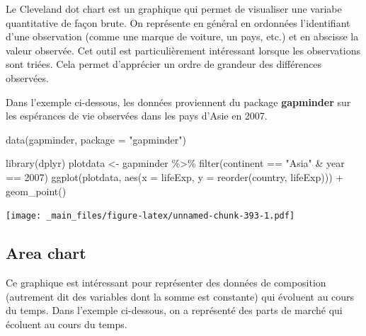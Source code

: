 \documentclass[
]{book}
\newenvironment{Shaded}{\begin{snugshade}}{\end{snugshade}}
\newcommand{\AttributeTok}[1]{\textcolor[rgb]{0.77,0.63,0.00}{#1}}
\newcommand{\DecValTok}[1]{\textcolor[rgb]{0.00,0.00,0.81}{#1}}
\newcommand{\FunctionTok}[1]{\textcolor[rgb]{0.00,0.00,0.00}{#1}}
\newcommand{\NormalTok}[1]{#1}
\newcommand{\OtherTok}[1]{\textcolor[rgb]{0.56,0.35,0.01}{#1}}
\newcommand{\SpecialCharTok}[1]{\textcolor[rgb]{0.00,0.00,0.00}{#1}}
\newcommand{\StringTok}[1]{\textcolor[rgb]{0.31,0.60,0.02}{#1}}
\theoremstyle{definition}
\theoremstyle{definition}
\theoremstyle{definition}
\theoremstyle{definition}
\theoremstyle{remark}
\begin{document}
Le Cleveland dot chart est un graphique qui permet de visualiser une variabe quantitative de façon brute. On représente en général en ordonnées l'identifiant d'une observation (comme une marque de voiture, un pays, etc.) et en abscisse la valeur observée. Cet outil est particulièrement intéressant lorsque les observations sont triées. Cela permet d'apprécier un ordre de grandeur des différences observées.

Dans l'exemple ci-dessous, les données proviennent du package \textbf{gapminder} sur les espérances de vie observées dans les pays d'Asie en 2007.

\begin{Shaded}
\begin{Highlighting}[]
\FunctionTok{data}\NormalTok{(gapminder, }\AttributeTok{package =} \StringTok{"gapminder"}\NormalTok{)}

\FunctionTok{library}\NormalTok{(dplyr)}
\NormalTok{plotdata }\OtherTok{\textless{}{-}}\NormalTok{ gapminder }\SpecialCharTok{\%\textgreater{}\%}
  \FunctionTok{filter}\NormalTok{(continent }\SpecialCharTok{==} \StringTok{"Asia"} \SpecialCharTok{\&} 
\NormalTok{         year }\SpecialCharTok{==} \DecValTok{2007}\NormalTok{)}
\FunctionTok{ggplot}\NormalTok{(plotdata, }
       \FunctionTok{aes}\NormalTok{(}\AttributeTok{x =}\NormalTok{ lifeExp, }
           \AttributeTok{y =} \FunctionTok{reorder}\NormalTok{(country, }
\NormalTok{                   lifeExp))) }\SpecialCharTok{+}
  \FunctionTok{geom\_point}\NormalTok{()}
\end{Highlighting}
\end{Shaded}

\texttt{[image: \_main\_files/figure-latex/unnamed-chunk-393-1.pdf]}

\hypertarget{area-chart}{%
\subsection{Area chart}\label{area-chart}}

Ce graphique est intéressant pour représenter des données de composition (autrement dit des variables dont la somme est constante) qui évoluent au cours du temps. Dans l'exemple ci-dessous, on a représenté des parts de marché qui écoluent au cours du temps.
\end{document}
